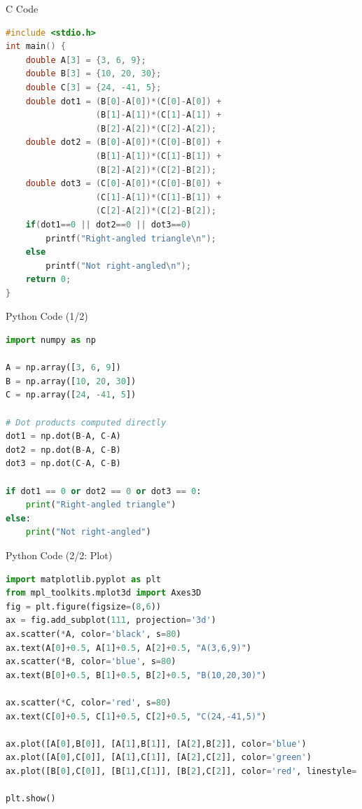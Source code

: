 \documentclass{beamer}
\begin{document}
\begin{frame}[fragile]{C Code}
\begin{lstlisting}[language=C]
#include <stdio.h>
int main() {
    double A[3] = {3, 6, 9};
    double B[3] = {10, 20, 30};
    double C[3] = {24, -41, 5};
    double dot1 = (B[0]-A[0])*(C[0]-A[0]) +
                  (B[1]-A[1])*(C[1]-A[1]) +
                  (B[2]-A[2])*(C[2]-A[2]);
    double dot2 = (B[0]-A[0])*(C[0]-B[0]) +
                  (B[1]-A[1])*(C[1]-B[1]) +
                  (B[2]-A[2])*(C[2]-B[2]);
    double dot3 = (C[0]-A[0])*(C[0]-B[0]) +
                  (C[1]-A[1])*(C[1]-B[1]) +
                  (C[2]-A[2])*(C[2]-B[2]);
    if(dot1==0 || dot2==0 || dot3==0)
        printf("Right-angled triangle\n");
    else
        printf("Not right-angled\n");
    return 0;
}
\end{lstlisting}
\end{frame}


\begin{frame}[fragile]{Python Code (1/2)}
\begin{lstlisting}[language=Python]
import numpy as np

A = np.array([3, 6, 9])
B = np.array([10, 20, 30])
C = np.array([24, -41, 5])

# Dot products computed directly
dot1 = np.dot(B-A, C-A)
dot2 = np.dot(B-A, C-B)
dot3 = np.dot(C-A, C-B)

if dot1 == 0 or dot2 == 0 or dot3 == 0:
    print("Right-angled triangle")
else:
    print("Not right-angled")
\end{lstlisting}
\end{frame}

\begin{frame}[fragile]{Python Code (2/2: Plot)}
\begin{lstlisting}[language=Python]
import matplotlib.pyplot as plt
from mpl_toolkits.mplot3d import Axes3D
fig = plt.figure(figsize=(8,6))
ax = fig.add_subplot(111, projection='3d')
ax.scatter(*A, color='black', s=80)
ax.text(A[0]+0.5, A[1]+0.5, A[2]+0.5, "A(3,6,9)")
ax.scatter(*B, color='blue', s=80)
ax.text(B[0]+0.5, B[1]+0.5, B[2]+0.5, "B(10,20,30)")

ax.scatter(*C, color='red', s=80)
ax.text(C[0]+0.5, C[1]+0.5, C[2]+0.5, "C(24,-41,5)")

ax.plot([A[0],B[0]], [A[1],B[1]], [A[2],B[2]], color='blue')
ax.plot([A[0],C[0]], [A[1],C[1]], [A[2],C[2]], color='green')
ax.plot([B[0],C[0]], [B[1],C[1]], [B[2],C[2]], color='red', linestyle='--')

plt.show()
\end{lstlisting}
\end{frame}
\end{document}
